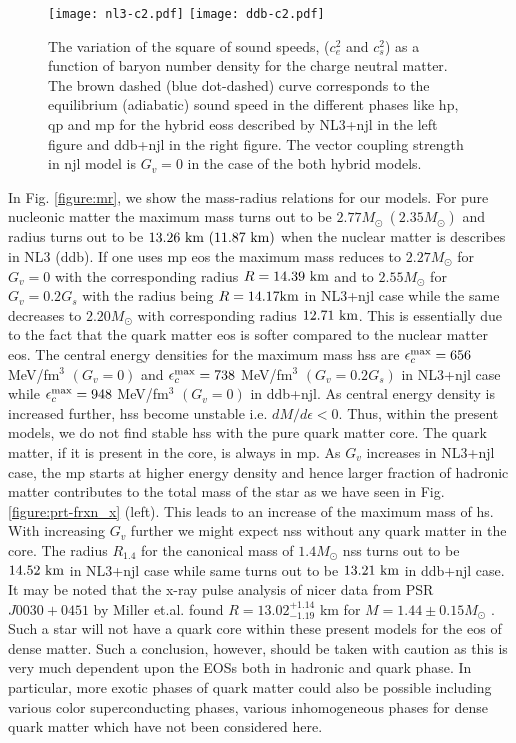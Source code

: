 \documentclass[a4paper, 11pt]{article}
\begin{document}
\begin{figure}
\centering
\texttt{[image: nl3-c2.pdf]}
\texttt{[image: ddb-c2.pdf]}
\caption{The variation of the square of sound speeds, ($c_e^2$ and $c_s^2$) as a function of baryon number
 density for the charge neutral matter. The brown dashed (blue dot-dashed) curve corresponds to the equilibrium (adiabatic) 
sound speed in the different phases like \ac{hp}, \ac{qp} and \ac{mp} for the hybrid \ac{eos}s described by 
NL3+\ac{njl} in the left figure and \ac{ddb}+\ac{njl} in the right figure. The vector coupling 
strength in \ac{njl} model is $G_v = 0$ in the case of the both hybrid models.}
\label{figure:cs2}
\end{figure}

In Fig. \ref{figure:mr}, we show the mass-radius relations for our models. For pure nucleonic matter the 
maximum mass turns out to be $2.77 M_{\odot}\ (2.35 M_{\odot})$ and radius turns out to be $13.26\ {\rm km}\ (11.87\ {\rm km})$ 
when the nuclear matter is describes in NL3 (\ac{ddb}). If one uses \ac{mp} \ac{eos} the maximum mass reduces
 to $2.27  M_{\odot}$ for $G_v=0$ with the corresponding radius $R=14.39\ {\rm km}$ and to $2.55 M_{\odot}$ for
 $G_v=0.2 G_s$ with the radius being $R=14.17 {\rm km}$ in NL3+\ac{njl} case while the same decreases to $2.20 M_{\odot}$
 with corresponding radius $12.71\ {\rm km}$. This is essentially due to the fact that the quark matter \ac{eos} is
 softer compared  to the nuclear matter \ac{eos}. The central energy densities for the maximum mass \ac{hs}s are
 $\epsilon_c^{\rm max}=656$ MeV/fm$^{3}$ $(G_v=0)$ and $\epsilon_c^{\rm max}=738$ MeV/fm$^{3}$ $(G_v=0.2 G_s)$
 in NL3+\ac{njl} case while $\epsilon_c^{\rm max}=948$ MeV/fm$^{3}$ $(G_v=0)$ in \ac{ddb}+\ac{njl}. As central energy
 density is increased further, \ac{hs}s become unstable i.e. $dM/d\epsilon<0$. Thus, within the present models, we do not
 find stable \ac{hs}s with the pure quark matter core. The quark matter, if it is present in the core, is always
 in \ac{mp}. As $G_v$ increases in NL3+\ac{njl} case, the \ac{mp} starts at higher energy density and hence larger fraction
 of hadronic matter contributes to the total mass of the star as we have seen in Fig. \ref{figure:prt-frxn_x} (left). This 
leads to an increase of the maximum mass of \ac{hs}. With increasing $G_v$ further we might expect \ac{ns}s without
 any quark matter in the core. The radius $R_{1.4}$ for the canonical mass of $1.4 M_{\odot}$ \ac{ns}s turns out to be
 $14.52\ {\rm km}$ in NL3+\ac{njl} case while same turns out to be $13.21\ {\rm km}$ in \ac{ddb}+\ac{njl} case.
 It may be noted that the x-ray pulse analysis of \ac{nicer} data from PSR $J0030+0451$ by Miller et.al. found
 $R=13.02^{+1.14}_{-1.19}$ km for $M=1.44\pm 0.15 M_{\odot}$ \cite{Miller:2019}.
 Such a star will not have a quark core within these present models for the \ac{eos} of dense matter. 
Such a conclusion, however, should be taken with caution as this is very much dependent upon the EOSs  both in hadronic and quark phase. 
In particular, more exotic phases of quark matter could also be possible including  various color superconducting phases,
 various inhomogeneous phases for dense quark matter which have not been considered here.
\end{document}
